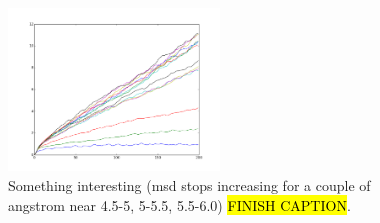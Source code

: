 \begin{figure}[htpb]%
    \centering%
    \includegraphics[width=0.5\textwidth]{images/diffusion/mean_square_displacement_interesting.png}%
    \caption{%
        Something interesting (msd stops increasing for a couple of angstrom near 4.5-5, 5-5.5, 5.5-6.0) \hl{FINISH CAPTION}. %
    }%
\end{figure}%

